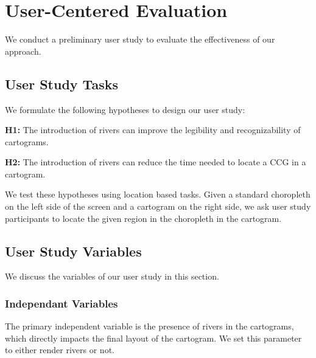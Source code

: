 \color{blue}

\newcommand{\pCount}{14 }
\section{User-Centered Evaluation}

We conduct a preliminary user study to evaluate the effectiveness of our approach. 

\subsection{User Study Tasks}

We formulate the following hypotheses to design our user study:

\textbf{H1:} The introduction of rivers can improve the legibility and recognizability of cartograms.

\textbf{H2:} The introduction of rivers can reduce the time needed to locate a CCG in a cartogram.

We test these hypotheses using location based tasks. Given a standard choropleth on the left side of the screen and a cartogram on the right side, we ask user study participants to locate the given region in the choropleth in the cartogram.

\subsection{User Study Variables}

We discuss the variables of our user study in this section.

\subsubsection{Independant Variables}

The primary independent variable is the presence of rivers in the cartograms, which directly impacts the final layout of the cartogram. We set this parameter to either render rivers or not.



